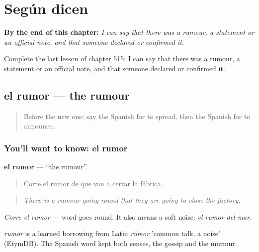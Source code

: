 
\chapter{Según dicen}
\label{ch:es-segun-dicen}

\begin{chapteropening}
\textbf{By the end of this chapter:} \emph{I can say that there was a rumour, a statement or an official note, and that someone declared or confirmed it.}

Complete the last lesson of chapter 515: I can say that there was a rumour, a statement or an official note, and that someone declared or confirmed it.
\end{chapteropening}

\section[el rumor]{el rumor — the rumour}

\label{lesson:ES-C515-rumor}



\begin{quote}
Before the new one: say the Spanish for to spread, then the Spanish for to announce.
\end{quote}

\subsection*{You'll want to know: el rumor}
\textbf{el rumor} — \textquotedblleft{}the rumour\textquotedblright{}.

\begin{quote}
Corre el rumor de que van a cerrar la fábrica.
\end{quote}

\begin{quote}
\emph{There is a rumour going round that they are going to close the factory.}
\end{quote}

\emph{Corre el rumor} — word goes round. It also means a soft noise: \emph{el rumor del mar}.

\begin{cousinweb}
\emph{rumor} is a learned borrowing from Latin \emph{rūmor} 'common talk, a noise' (EtymDB). The Spanish word kept both senses, the gossip and the murmur.
\end{cousinweb}

